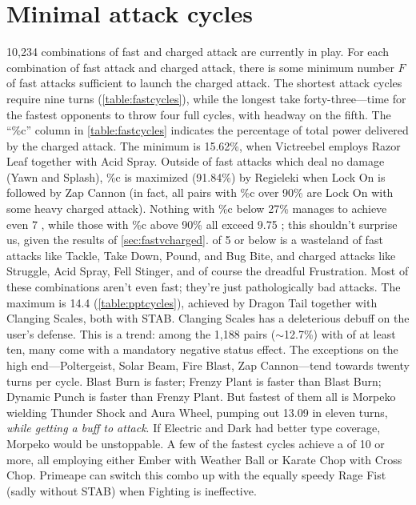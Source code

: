 \section{Minimal attack cycles\label{sec:minimalcycles}}
10,234 combinations of fast and charged attack are currently in play.
For each combination of fast attack and charged attack, there is some minimum number
 $F$ of fast attacks sufficient to launch the charged attack.
The shortest attack cycles require nine turns (\autoref{table:fastcycles}),
 while the longest take forty-three---time for the fastest opponents to
 throw four full cycles, with headway on the fifth.
The ``\%c'' column in \autoref{table:fastcycles} indicates the percentage of total
 power delivered by the charged attack.
The minimum is 15.62\%, when Victreebel employs Razor Leaf together with Acid Spray.
Outside of fast attacks which deal no damage (Yawn and Splash), \%c is maximized (91.84\%)
 by Regieleki when Lock On is followed by Zap Cannon
 (in fact, all pairs with \%c over 90\% are Lock On with some heavy charged attack).
Nothing with \%c below 27\% manages to achieve even 7 \PPT{}, while
 those with \%c above 90\% all exceed 9.75 \PPT{}; this shouldn't surprise
 us, given the results of \autoref{sec:fastvcharged}.
\PPT{} of 5 or below is a wasteland of fast attacks like Tackle, Take Down, Pound, and Bug Bite,
 and charged attacks like Struggle, Acid Spray, Fell Stinger, and of course the dreadful Frustration.
Most of these combinations aren't even fast; they're just pathologically bad attacks.
The maximum \PPT{} is 14.4 (\autoref{table:pptcycles}), achieved by Dragon Tail together with Clanging Scales, both with STAB\@.
Clanging Scales has a deleterious debuff on the user's defense.
This is a trend: among the 1,188 pairs ($\sim$12.7\%) with \PPT{} of at least ten,
 many come with a mandatory negative status effect.
The exceptions on the high end---Poltergeist, Solar Beam, Fire Blast, Zap Cannon---tend towards twenty turns per cycle.
Blast Burn is faster; Frenzy Plant is faster than Blast Burn; Dynamic Punch is faster than Frenzy Plant.
But fastest of them all is Morpeko wielding Thunder Shock and Aura Wheel, pumping out 13.09 \PPT{}
 in eleven turns, \textit{while getting a buff to attack}.
If Electric and Dark had better type coverage, Morpeko would be unstoppable.
A few of the fastest cycles achieve a \PPT{} of 10 or more, all employing either Ember with Weather Ball or Karate Chop with Cross Chop.
Primeape can switch this combo up with the equally speedy Rage Fist (sadly without STAB) when Fighting is ineffective.

